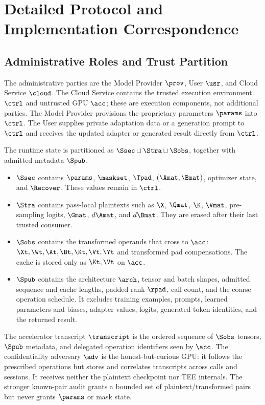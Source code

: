 \section{Detailed Protocol and Implementation Correspondence}
\label{app:protocol}
\label{app:impl}

\subsection{Administrative Roles and Trust Partition}

The administrative parties are the Model Provider $\prov$, User $\usr$, and
Cloud Service $\cloud$. The Cloud Service contains the trusted execution
environment $\ctrl$ and untrusted GPU $\acc$; these are execution components,
not additional parties. The Model Provider provisions the proprietary
parameters $\params$ into $\ctrl$. The User supplies private adaptation data or
a generation prompt to $\ctrl$ and receives the updated adapter or generated
result directly from $\ctrl$.

The runtime state is partitioned as $\Ssec\sqcup\Stra\sqcup\Sobs$, together
with admitted metadata $\Spub$.
\begin{itemize}
\item $\Ssec$ contains $\params$, $\maskset$, $\Tpad$, $(\Amat,\Bmat)$,
optimizer state, and $\Recover$. These values remain in $\ctrl$.
\item $\Stra$ contains pass-local plaintexts such as $\X$, $\Qmat$, $\K$,
$\Vmat$, pre-sampling logits, $\Gmat$, $d\Amat$, and $d\Bmat$. They are erased
after their last trusted consumer.
\item $\Sobs$ contains the transformed operands that cross to $\acc$:
$\Xt,\Wt,\At,\Bt,\Kt,\Vt,\Yt$ and transformed pad compensations. The cache is
stored only as $\Kt,\Vt$ on $\acc$.
\item $\Spub$ contains the architecture $\arch$, tensor and batch shapes,
admitted sequence and cache lengths, padded rank $\rpad$, call count, and the
coarse operation schedule. It excludes training examples, prompts, learned
parameters and biases, adapter values, logits, generated token identities, and
the returned result.
\end{itemize}

The accelerator transcript $\transcript$ is the ordered sequence of $\Sobs$
tensors, $\Spub$ metadata, and delegated operation identifiers seen by $\acc$.
The confidentiality adversary $\adv$ is the honest-but-curious GPU: it follows
the prescribed operations but stores and correlates transcripts across calls
and sessions. It receives neither the plaintext checkpoint nor TEE internals.
The stronger known-pair audit grants a bounded set of plaintext/transformed
pairs but never grants $\params$ or mask state.

